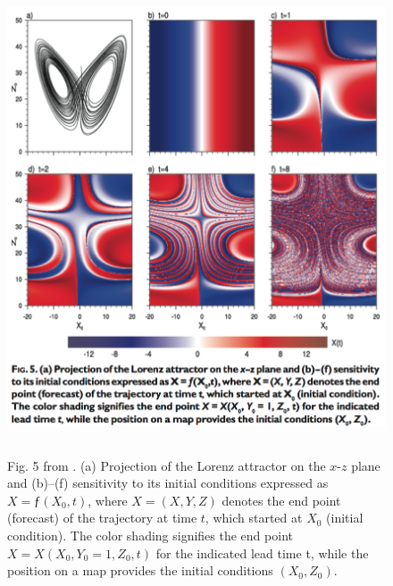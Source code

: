 \begin{figure}
    \begin{center}
        \includegraphics[height=33pc,width=33pc,angle=0]{figs/lorenz_attractor.png}
        \caption{\small Fig. 5 from \cite{hohenegger2007predictability}. (a) Projection of the Lorenz attractor on the $x$-$z$ plane and (b)–(f) sensitivity to its initial conditions expressed as $X = ƒ(X_0,t)$, where $X = (X, Y, Z)$ denotes the end point (forecast) of the trajectory at time $t$, which started at $X_0$ (initial condition). The color shading signifies the end point $X = X(X_0, Y_0 = 1, Z_0, t)$ for the indicated lead time t, while the position on a map provides the initial conditions $(X_0, Z_0)$.}
        \label{fig:lorenz}
    \end{center}
\end{figure}

